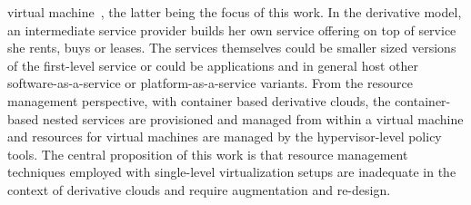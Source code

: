 virtual machine~\cite{spotcheck, google}, 
the latter being the focus of this work.
%
In the derivative model, an intermediate service provider builds
her own service offering on top of service she rents, buys or leases.
%
The services themselves could be smaller sized versions of the
first-level service or could be applications and in general host
other software-as-a-service or platform-as-a-service variants.
%
From the resource management perspective, with container based
derivative clouds, the container-based nested services
are provisioned and managed from within a virtual machine
and resources for virtual machines are managed by the 
hypervisor-level policy tools.
%
%
%
The central proposition of this work is that resource management
techniques employed with single-level virtualization setups
are inadequate in the context of derivative clouds 
and require augmentation and re-design.
%

